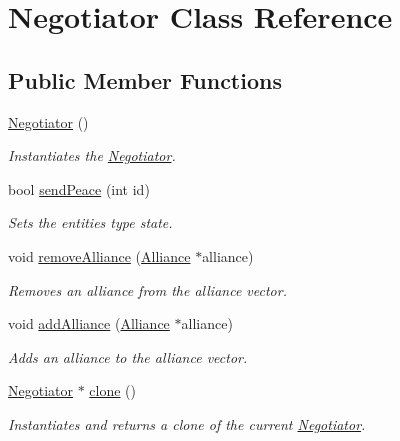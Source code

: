 \hypertarget{classNegotiator}{}\section{Negotiator Class Reference}
\label{classNegotiator}
\subsection*{Public Member Functions}
\begin{DoxyCompactItemize}
\item 
\mbox{\label{classNegotiator_aa667cc5e0bca1109e2eae6d84e8ba3d9}} 
\hyperlink{classNegotiator_aa667cc5e0bca1109e2eae6d84e8ba3d9}{Negotiator} ()
\begin{DoxyCompactList}\small\item\em Instantiates the \hyperlink{classNegotiator}{Negotiator}. \end{DoxyCompactList}\item 
bool \hyperlink{classNegotiator_a30efddcdba1469a147a7429a540033b1}{send\+Peace} (int id)
\begin{DoxyCompactList}\small\item\em Sets the entities type state. \end{DoxyCompactList}\item 
void \hyperlink{classNegotiator_a07c553b2540ed330d96decdae3ef2068}{remove\+Alliance} (\hyperlink{classAlliance}{Alliance} $\ast$alliance)
\begin{DoxyCompactList}\small\item\em Removes an alliance from the alliance vector. \end{DoxyCompactList}\item 
void \hyperlink{classNegotiator_ac8df6d3b6d75212252eecf1b50ecc8d4}{add\+Alliance} (\hyperlink{classAlliance}{Alliance} $\ast$alliance)
\begin{DoxyCompactList}\small\item\em Adds an alliance to the alliance vector. \end{DoxyCompactList}\item 
\hyperlink{classNegotiator}{Negotiator} $\ast$ \hyperlink{classNegotiator_adafefed500d3f36649696b3d2fc92be7}{clone} ()
\begin{DoxyCompactList}\small\item\em Instantiates and returns a clone of the current \hyperlink{classNegotiator}{Negotiator}. \end{DoxyCompactList}\end{DoxyCompactItemize}


